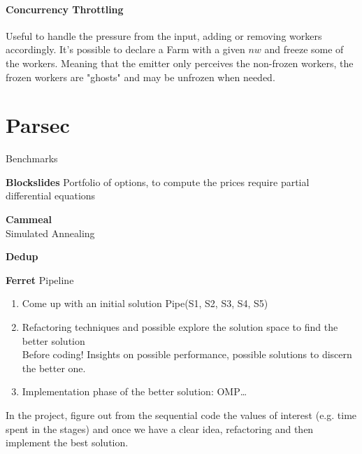 \documentclass[10pt]{report}
\begin{document}
\paragraph{Concurrency Throttling} Useful to handle the pressure from the input, adding or removing workers accordingly. It's possible to declare a Farm with a given $nw$ and freeze some of the workers. Meaning that the emitter only perceives the non-frozen workers, the frozen workers are "ghosts" and may be unfrozen when needed.

\section{Parsec} Benchmarks %
\begin{list}{}{}
	\item \textbf{Blockslides} Portfolio of options, to compute the prices require partial differential equations
	\item \textbf{Cammeal}\\
	Simulated Annealing
	\item \textbf{Dedup}
	\item \textbf{Ferret} Pipeline
\end{list}
\begin{enumerate}
	\item Come up with an initial solution Pipe(S1, S2, S3, S4, S5)
	\item Refactoring techniques and possible explore the solution space to find the better solution\\
	Before coding! Insights on possible performance, possible solutions to discern the better one.
	\item Implementation phase of the better solution: OMP\ldots
\end{enumerate}
In the project, figure out from the sequential code the values of interest (e.g. time spent in the stages) and once we have a clear idea, refactoring and then implement the best solution.
\end{document}
